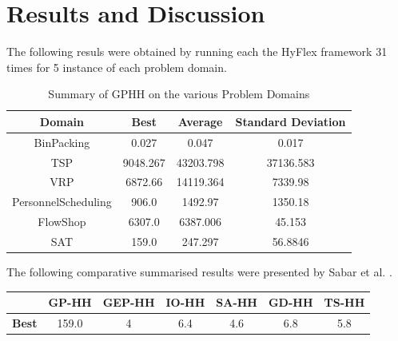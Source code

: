 \documentclass[a4paper,12pt]{article}
\begin{document}
\section{Results and Discussion} \label{sec:results}  
    \par{
        The following resuls were obtained by running each the HyFlex framework 31 times for 5 instance of each problem domain.
        \begin{table}[ht] 
                \small 
                \begin{tabular}{| c | c | c | c |} 
                    \hline
                    \textbf{Domain} & \textbf{Best} & \textbf{Average} & \textbf{Standard Deviation} \\
                    \hline
                    BinPacking & 0.027 & 0.047 & 0.017\\
                    \hline
                    TSP & 9048.267 & 43203.798 & 37136.583\\
                    \hline
                    VRP & 6872.66 & 14119.364 & 7339.98\\
                    \hline
                    PersonnelScheduling & 906.0  & 1492.97  & 1350.18\\
                    \hline
                    FlowShop &  6307.0 & 6387.006 & 45.153 \\
                    \hline
                    SAT & 159.0  & 247.297& 56.8846 \\
                    \hline  
                \end{tabular}
                \caption{Summary of GPHH on the various Problem Domains} 
        \end{table}
        \newline
        The following comparative summarised results were presented by Sabar et al. \cite{gehh}. 
        \begin{table}[ht] 
                \small 
                \centering
                \begin{tabular}{| c | c | c | c | c| c| c|} 
                    \hline   
                    &\textbf{GP-HH} & \textbf{GEP-HH} & \textbf{IO-HH} & \textbf{SA-HH} & \textbf{GD-HH} & \textbf{TS-HH} \\
                    \hline
                    \textbf{Best} & 159.0 & 4 & 6.4 & 4.6 & 6.8 & 5.8\\

\end{tabular}
\end{table}}
\end{document}
